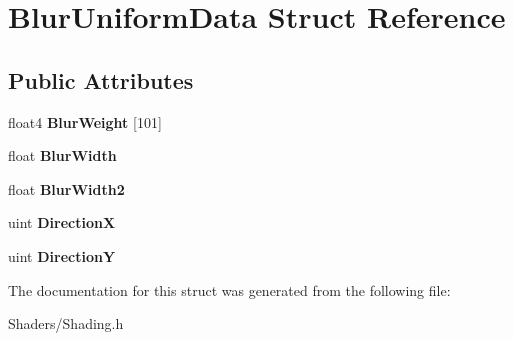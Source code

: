 \hypertarget{structBlurUniformData}{}\section{Blur\+Uniform\+Data Struct Reference}
\label{structBlurUniformData}
\subsection*{Public Attributes}
\begin{DoxyCompactItemize}
\item 
\mbox{\label{structBlurUniformData_a7fc2e7740f3332e68734107a0b8b1b9f}} 
float4 {\bfseries Blur\+Weight} \mbox{[}101\mbox{]}
\item 
\mbox{\label{structBlurUniformData_a921f4861bece9134a4d79089807dbef9}} 
float {\bfseries Blur\+Width}
\item 
\mbox{\label{structBlurUniformData_a2b178d1e83aa716de2ccdb955576f096}} 
float {\bfseries Blur\+Width2}
\item 
\mbox{\label{structBlurUniformData_a6c0e6c302cbd2cb69ac976ee0ef0eaaa}} 
uint {\bfseries DirectionX}
\item 
\mbox{\label{structBlurUniformData_a37b136a5eaca0a4c9e8d7eb81866a6cd}} 
uint {\bfseries DirectionY}
\end{DoxyCompactItemize}


The documentation for this struct was generated from the following file\+:\begin{DoxyCompactItemize}
\item 
Shaders/Shading.\+h\end{DoxyCompactItemize}
